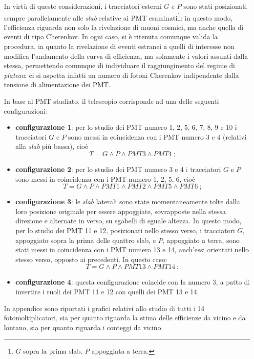 \documentclass[11pt, oneside, a4paper]{article}   	%
\begin{document}
In virtù di queste considerazioni, i tracciatori esterni $G$ e $P$ sono stati posizionati sempre parallelamente alle \emph{slab} relative ai PMT esaminati\footnote{$G$ sopra la prima slab, $P$ appoggiata a terra.}: in questo modo, l'efficienza riguarda non solo la rivelazione di muoni cosmici, ma anche quella di eventi di tipo Cherenkov. In ogni caso, si è ritenuta comunque valida la procedura, in quanto la rivelazione di eventi estranei a quelli di interesse non modifica l'andamento della curva di efficienza, ma solamente i valori assunti dalla stessa, permettendo comunque di individuare il raggiungimento del regime di \emph{plateau}: ci si aspetta infatti un numero di fotoni Cherenkov indipendente dalla tensione di alimentazione dei PMT.

In base al PMT studiato, il telescopio corrisponde ad una delle seguenti configurazioni:
\begin{itemize}
	\item \textbf{configurazione 1}: per lo studio dei PMT numero 1, 2, 5, 6, 7, 8, 9 e 10 i tracciatori $G$ e $P$ sono messi in coincidenza con i PMT numero 3 e 4 (relativi alla \emph{slab} più bassa), cioè \[T = G\wedge P \wedge PMT3 \wedge PMT4 \ ;\]
%
	\item \textbf{configurazione 2}: per lo studio dei PMT numero 3 e 4 i tracciatori $G$ e $P$ sono messi in coincidenza con i PMT numero 1, 2, 5, 6, cioè \[T = G\wedge P \wedge PMT1 \wedge PMT2 \wedge PMT5 \wedge PMT6 \ ; \]
%
	\item \textbf{configurazione 3}: le \emph{slab} laterali sono state momentaneamente tolte dalla loro posizione originale per essere appoggiate, sovrapposte nella stessa direzione e alternate in verso, su sgabelli di eguale altezza. In questo modo, per lo studio dei PMT 11 e 12, posizionati nello stesso verso, i tracciatori $G$, appoggiato sopra la prima delle quattro slab, e $P$, appoggiato a terra, sono stati messi in coincidenza con i PMT numero 13 e 14, anch'essi orientati nello stesso verso, opposto ai precedenti. In questo caso: \[T = G\wedge P \wedge PMT13 \wedge PMT14 \ ;\]
%
	\item \textbf{configurazione 4}: questa configurazione coincide con la numero 3, a patto di invertire i ruoli dei PMT 11 e 12 con quelli dei PMT 13 e 14. 
\end{itemize}
In appendice sono riportati i grafici relativi allo studio di tutti i 14 fotomoltiplicatori, sia per quanto riguarda la stima delle efficienze da vicino e da lontano, sia per quanto riguarda i conteggi da vicino.
\end{document}
